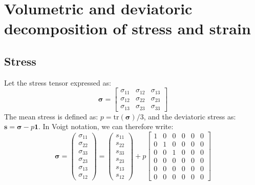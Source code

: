 \documentclass[letterpaper,12pt,oneside]{report}
\begin{document}
\section{Volumetric and deviatoric decomposition of stress and strain}

\subsection{Stress}
Let the stress tensor expressed as:
\begin{equation}
\boldsymbol{\sigma} = 
\left[\begin{array}{ccc}
\sigma_{11} & \sigma_{12} & \sigma_{13} \\
\sigma_{12} & \sigma_{22} & \sigma_{23} \\
\sigma_{13} & \sigma_{23} & \sigma_{33}
\end{array}\right]
\end{equation}
The mean stress is defined as: $p = \mathrm{tr}(\boldsymbol{\sigma})/3$, and the deviatoric stress as: $\mathbf{s} = \boldsymbol{\sigma} - p \mathbf{1}$. In Voigt notation, we can therefore write:
\begin{equation}
\boldsymbol{\sigma} = 
\left(\begin{array}{c}
\sigma_{11} \\ \sigma_{22} \\ \sigma_{33} \\ \sigma_{23} \\ \sigma_{13} \\ \sigma_{12}
\end{array}\right)
 = 
\left(\begin{array}{c}
s_{11} \\ s_{22} \\ s_{33} \\ s_{23} \\ s_{13} \\ s_{12}
\end{array}\right)
+ p
\left[\begin{array}{cccccc}
1 & 0 & 0 & 0 & 0 & 0 \\
0 & 1 & 0 & 0 & 0 & 0 \\
0 & 0 & 1 & 0 & 0 & 0 \\
0 & 0 & 0 & 0 & 0 & 0 \\
0 & 0 & 0 & 0 & 0 & 0 \\
0 & 0 & 0 & 0 & 0 & 0
\end{array}\right]
\end{equation}
\end{document}

